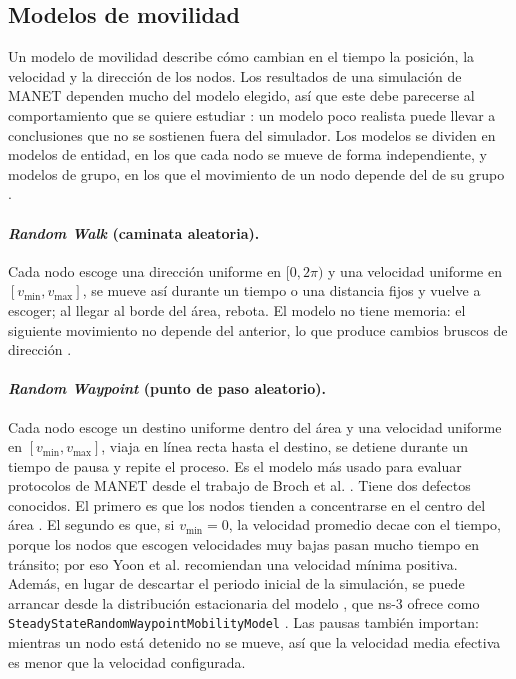\subsection{Modelos de movilidad}
\label{sec:marco-movilidad}

Un modelo de movilidad describe cómo cambian en el tiempo la posición, la velocidad y
la dirección de los nodos. Los resultados de una simulación de MANET dependen mucho del
modelo elegido, así que este debe parecerse al comportamiento que se quiere estudiar
\cite{camp2002survey}: un modelo poco realista puede llevar a conclusiones que no se
sostienen fuera del simulador. Los modelos se dividen en modelos de entidad, en los que cada
nodo se mueve de forma independiente, y modelos de grupo, en los que el movimiento de
un nodo depende del de su grupo \cite{camp2002survey}.

\paragraph{\emph{Random Walk} (caminata aleatoria).} Cada nodo escoge una dirección
uniforme en $[0, 2\pi)$ y una velocidad uniforme en $[v_{\min}, v_{\max}]$, se mueve así
durante un tiempo o una distancia fijos y vuelve a escoger; al llegar al borde del área,
rebota. El modelo no tiene memoria: el siguiente movimiento no depende del anterior, lo
que produce cambios bruscos de dirección \cite{camp2002survey}.

\paragraph{\emph{Random Waypoint} (punto de paso aleatorio).} Cada nodo escoge un
destino uniforme dentro del área y una velocidad uniforme en $[v_{\min}, v_{\max}]$,
viaja en línea recta hasta el destino, se detiene durante un tiempo de pausa y repite
el proceso. Es el modelo más usado para evaluar protocolos de MANET desde el trabajo de
Broch et al. \cite{broch1998performance}. Tiene dos defectos conocidos. El primero es
que los nodos tienden a concentrarse en el centro del área \cite{camp2002survey}. El
segundo es que, si $v_{\min} = 0$, la velocidad promedio decae con el tiempo, porque los
nodos que escogen velocidades muy bajas pasan mucho tiempo en tránsito; por eso Yoon et
al. \cite{yoon2003harmful} recomiendan una velocidad mínima positiva. Además, en lugar
de descartar el periodo inicial de la simulación, se puede arrancar desde la
distribución estacionaria del modelo \cite{navidi2004stationary}, que ns-3 ofrece como
\texttt{SteadyStateRandomWaypointMobilityModel} \cite{ns3mobility}. Las pausas también
importan: mientras un nodo está detenido no se mueve, así que la velocidad media
efectiva es menor que la velocidad configurada.

